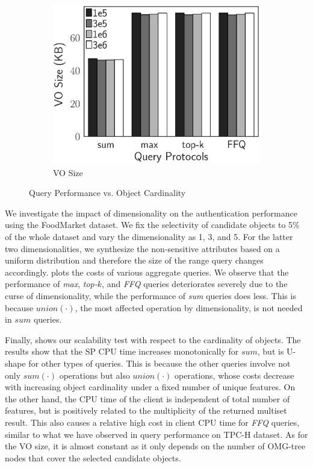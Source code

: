 \begin{figure}[t]
\begin{subfigure}[b]{.33\linewidth}
    \includegraphics[height=\ht\figbox]{exp-figs/aggregate-queries/cardinality_vo.eps}
    \caption{VO Size}
  \end{subfigure}
  \caption{Query Performance vs. Object Cardinality}\label{fig:aggregate-queries:diversity}
\end{figure}

We investigate the impact of dimensionality on the authentication performance using the FoodMarket dataset. We fix the selectivity of candidate objects to 5\% of the whole dataset and vary the dimensionality as 1, 3, and 5. For the latter two dimensionalities, we synthesize the non-sensitive attributes based on a uniform distribution and therefore the size of the range query changes accordingly.  plots the costs of various aggregate queries. We observe that the performance of \emph{max}, \emph{top-$k$}, and \emph{FFQ} queries deteriorates severely due to the curse of dimensionality, while the performance of \emph{sum} queries does less. This is because $union(\cdot)$, the most affected operation by dimensionality, is not needed in $sum$ queries.

Finally,  shows our scalability test with respect to the cardinality of objects.
The results show that the SP CPU time increases monotonically for $sum$, but is U-shape for other types of queries. This is because the other queries involve not only $sum(\cdot)$ operations but also $union(\cdot)$ operations, whose costs decrease with increasing object cardinality under a fixed number of unique features. On the other hand, the CPU time of the client is independent of total number of features, but is positively related to the multiplicity of the returned multiset result. This also causes a relative high cost in client CPU time for \emph{FFQ} queries, similar to what we have observed in query performance on TPC-H dataset. As for the VO size, it is almost constant as it only depends on the number of OMG-tree nodes that cover the selected candidate objects.

